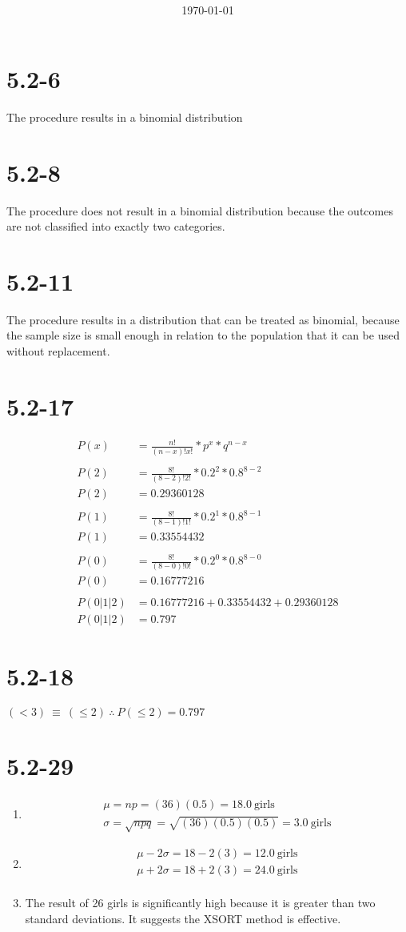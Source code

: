 \documentclass[12pt,fleqn]{article}
\title{\classdescription\ \\ \classname\ \\ $\ $ \\ \assignment}
\author{\authorname}
\date{\today}
\newcommand{\chapter}{5.2}
\newcommand{\problem}[1]{\vspace{5ex}\section*{\chapter-#1}}
\begin{document}
\maketitle

\problem{6}
The procedure results in a binomial distribution


\problem{8}
The procedure does not result in a binomial distribution because the outcomes are not classified into exactly two categories.


\problem{11}
The procedure results in a distribution that can be treated as binomial, because the sample size is small enough in relation to the population that it can be used without replacement.


\problem{17}
\begin{align*}
  P(x) &= \frac{n!}{(n-x)!x!} * p^x * q^{n-x} \\
\\
  P(2) &= \frac{8!}{(8-2)!2!} * 0.2^2 * 0.8^{8-2} \\
  P(2) &= 0.29360128 \\
\\
  P(1) &= \frac{8!}{(8-1)!1!} * 0.2^1 * 0.8^{8-1} \\
  P(1) &= 0.33554432 \\
\\
  P(0) &= \frac{8!}{(8-0)!0!} * 0.2^0 * 0.8^{8-0} \\
  P(0) &= 0.16777216 \\
\\
  P(0|1|2) &= 0.16777216 + 0.33554432 + 0.29360128 \\
  P(0|1|2) &= 0.797
\end{align*}


\problem{18}
$(< 3)~\equiv~(\le 2)~\therefore~P(\le{2}) = 0.797$


\problem{29}
\begin{enumerate}[label=\alph*.]
\item
  \begin{align*}
    \mu = np = (36)(0.5) = 18.0~\text{girls} \\
    \sigma = \sqrt{npq} = \sqrt{(36)(0.5)(0.5)} = 3.0~\text{girls}
  \end{align*}
\item
  \begin{align*}
    \mu - 2\sigma = 18 - 2(3) = 12.0~\text{girls} \\
    \mu + 2\sigma = 18 + 2(3) = 24.0~\text{girls} \\
  \end{align*}
\item
  The result of 26 girls is significantly high because it is greater than two standard deviations. It suggests the XSORT method is effective.
\end{enumerate}
\end{document}
